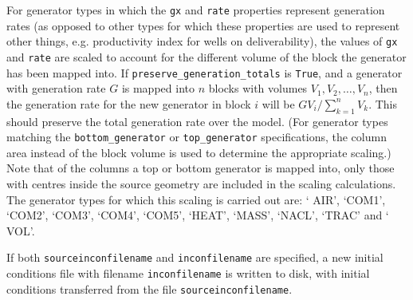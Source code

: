 For generator types in which the \texttt{gx} and \texttt{rate} properties represent generation rates (as opposed to other types for which these properties are used to represent other things, e.g. productivity index for wells on deliverability), the values of \texttt{gx} and \texttt{rate} are scaled to account for the different volume of the block the generator has been mapped into.  If \texttt{preserve\_generation\_totals} is \texttt{True}, and a generator with generation rate $G$ is mapped into $n$ blocks with volumes $V_1, V_2,\ldots, V_n$, then the generation rate for the new generator in block $i$ will be $G V_i/\sum_{k=1}^{n}{V_k}$.  This should preserve the total generation rate over the model.  (For generator types matching the \texttt{bottom\_generator} or \texttt{top\_generator} specifications, the column area instead of the block volume is used to determine the appropriate scaling.)  Note that of the columns a top or bottom generator is mapped into, only those with centres inside the source geometry are included in the scaling calculations.  The generator types for which this scaling is carried out are: ` AIR', `COM1', `COM2', `COM3', `COM4', `COM5', `HEAT', `MASS', `NACL', `TRAC'  and ` VOL'.

If both \texttt{sourceinconfilename} and \texttt{inconfilename} are specified, a new initial conditions file with filename \texttt{inconfilename} is written to disk, with initial conditions transferred from the file \texttt{sourceinconfilename}.

